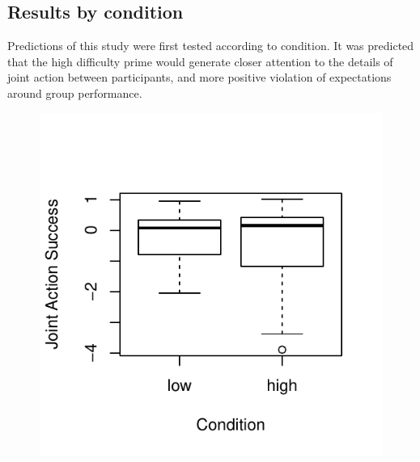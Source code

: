 \subsection{Results by condition}
Predictions of this study were first tested according to condition. It was predicted that the high difficulty prime would generate closer attention to the details of joint action between participants, and more positive violation of expectations around group performance.


\begin{figure}
\centering \includegraphics{images/groupJointActionSuccessPostBoxPlot-1}
              \label{fig:groupJointActionSuccessPostBoxPlot}
\end{figure}

